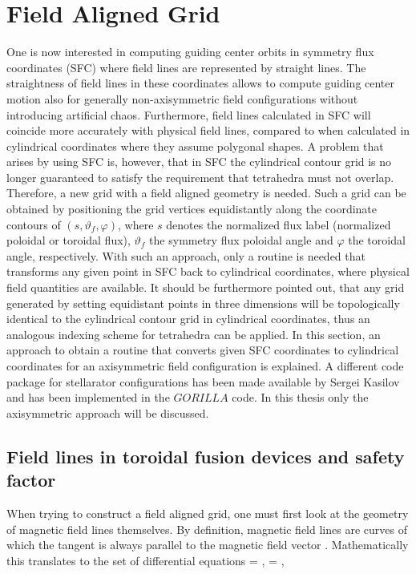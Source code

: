 \documentclass[./main.tex]{subfiles}
\begin{document}
\section{Field Aligned Grid}
One is now interested in computing guiding center orbits in symmetry flux coordinates (SFC) where field lines are represented by straight lines. The straightness of field lines in these coordinates allows to compute guiding center motion also for generally non-axisymmetric field configurations without introducing artificial chaos. Furthermore, field lines calculated in SFC will coincide more accurately with physical field lines, compared to when calculated in cylindrical coordinates where they assume polygonal shapes. A problem that arises by using SFC is, however, that in SFC the cylindrical contour grid is no longer guaranteed to satisfy the requirement that tetrahedra must not overlap. Therefore, a new grid with a field aligned geometry is needed. Such a grid can be obtained by positioning the grid vertices equidistantly along the coordinate contours of $(s,\vartheta_f,\varphi)$, where $s$ denotes the normalized flux label (normalized poloidal or toroidal flux), $\vartheta_f$ the symmetry flux poloidal angle and $\varphi$ the toroidal angle, respectively. With such an approach, only a routine is needed that transforms any given point in SFC back to cylindrical coordinates, where physical field quantities are available. It should be furthermore pointed out, that any grid generated by setting equidistant points in three dimensions will be topologically identical to the cylindrical contour grid in cylindrical coordinates, thus an analogous indexing scheme for tetrahedra can be applied. In this section, an approach to obtain a routine that converts given SFC coordinates to cylindrical coordinates for an axisymmetric field configuration is explained. A different code package for stellarator configurations has been made available by Sergei Kasilov and has been implemented in the $GORILLA$ code. In this thesis only the axisymmetric approach will be discussed. 

\subsection{Field lines in toroidal fusion devices and safety factor}
When trying to construct a field aligned grid, one must first look at the geometry of magnetic field lines themselves. By definition, magnetic field lines are curves of which the tangent is always parallel to the magnetic field vector \cite{haeseleer}. Mathematically this translates to the set of differential equations
 = , \hspace{0.1cm}  = ,
\ee
\end{document}
